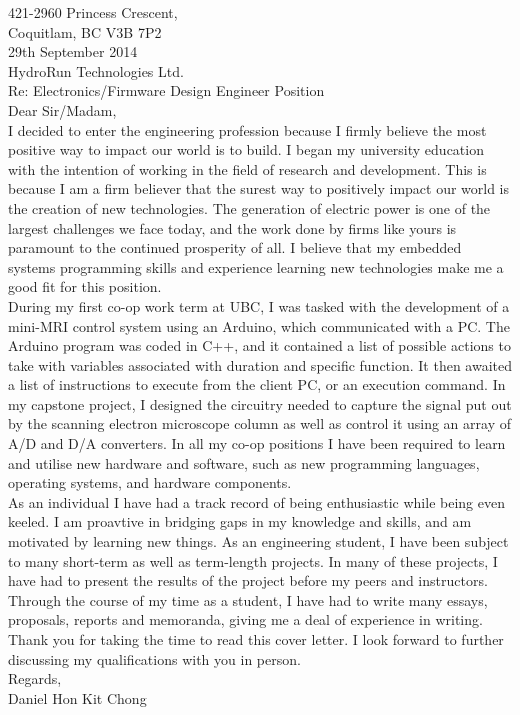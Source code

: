 \documentclass[10pt,a4paper]{article}
\begin{document}
\flushleft
\large
421-2960 Princess Crescent,\\
Coquitlam, BC V3B 7P2 \\
\medskip
29th September 2014 \\
\medskip
HydroRun Technologies Ltd.\\
\medskip
Re: Electronics/Firmware Design Engineer Position\\
\medskip
Dear Sir/Madam,\\

\medskip
\hspace{10mm}
I decided to enter the engineering profession because I firmly believe the most positive way to impact our world is to build.
I began my university education with the intention of working in the field of research and development. 
This is because I am a firm believer that the surest way to positively impact our world is the creation of new technologies.
The generation of electric power is one of the largest challenges we face today, and the work done by firms like yours is paramount to the continued
prosperity of all.
I believe that my embedded systems programming skills and experience learning new technologies make me a good fit for this position.
\\
\medskip
\hspace{10mm}
During my first co-op work term at UBC, I was tasked with the development of a mini-MRI control system using an Arduino, which communicated with a PC.
The Arduino program was coded in C++, and it contained a list of possible actions to take with variables associated with duration and specific function.
It then awaited a list of instructions to execute from the client PC, or an execution command.
In my capstone project, I designed the circuitry needed to capture the signal put out by the scanning electron microscope column as well as control it
using an array of A/D and D/A converters. 
In all my co-op positions I have been required to learn and utilise new hardware and software, such as new programming languages, operating systems,
and hardware components.
\\
\medskip
\hspace{10mm}
As an individual I have had a track record of being enthusiastic while being even keeled. 
I am proavtive in bridging gaps in my knowledge and skills, and am motivated by learning new things.
As an engineering student, I have been subject to many short-term as well as term-length projects.
In many of these projects, I have had to present the results of the project before my peers and instructors.
Through the course of my time as a student, I have had to write many essays, proposals, reports and memoranda, giving me a deal of experience in writing.
Thank you for taking the time to read this cover letter.
I look forward to further discussing my qualifications with you in person.\\


\bigskip
Regards, \\
Daniel Hon Kit Chong
\end{document}

